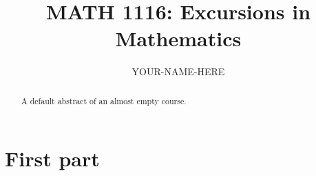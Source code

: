 \documentclass{xourse}
\title{MATH 1116: Excursions in Mathematics}
\author{YOUR-NAME-HERE}
\begin{document}
\begin{abstract}
    A default abstract of an almost empty course.
\end{abstract}
\maketitle

\part{First part}

\end{document}

